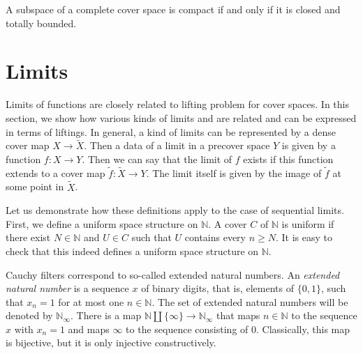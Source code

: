 \documentclass[reqno]{amsart}
\theoremstyle{definition}
\theoremstyle{remark}
\numberwithin{figure}{section}
\begin{document}
\begin{cor}
A subspace of a complete cover space is compact if and only if it is closed and totally bounded.
\end{cor}

\section{Limits}

Limits of functions are closely related to lifting problem for cover spaces.
In this section, we show how various kinds of limits and are related and can be expressed in terms of liftings.
In general, a kind of limits can be represented by a dense cover map $X \to \widetilde{X}$.
Then a data of a limit in a precover space $Y$ is given by a function $f : X \to Y$.
Then we can say that the limit of $f$ exists if this function extends to a cover map $\widetilde{f} : \widetilde{X} \to Y$.
The limit itself is given by the image of $\widetilde{f}$ at some point in $\widetilde{X}$.

Let us demonstrate how these definitions apply to the case of sequential limits.
First, we define a uniform space structure on $\mathbb{N}$.
A cover $C$ of $\mathbb{N}$ is uniform if there exist $N \in \mathbb{N}$ and $U \in C$ such that $U$ contains every $n \geq N$.
It is easy to check that this indeed defines a uniform space structure on $\mathbb{N}$.

Cauchy filters correspond to so-called extended natural numbers.
An \emph{extended natural number} is a sequence $x$ of binary digits, that is, elements of $\{ 0, 1 \}$, such that $x_n = 1$ for at most one $n \in \mathbb{N}$.
The set of extended natural numbers will be denoted by $\mathbb{N}_\infty$.
There is a map $\mathbb{N} \amalg \{ \infty \} \to \mathbb{N}_\infty$ that maps $n \in \mathbb{N}$ to the sequence $x$ with $x_n = 1$ and maps $\infty$ to the sequence consisting of $0$.
Classically, this map is bijective, but it is only injective constructively.
\end{document}
